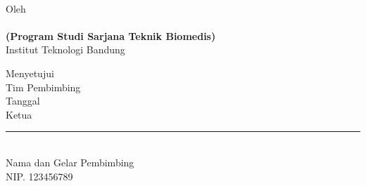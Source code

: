\clearpage
\pagestyle{empty}

\begin{center}
	\renewcommand{\baselinestretch}{1}
    \large{\bfseries \MakeUppercase{\thetitle}}
    \\[2\baselineskip]
	
    \normalsize{Oleh\\
    \textbf{\theauthor}\\
    \textbf{(Program Studi Sarjana Teknik Biomedis)}
    \\[\baselineskip]
    Institut Teknologi Bandung}
    \\[3\baselineskip]

    \normalsize{Menyetujui\\
    Tim Pembimbing
    \\[\baselineskip]
    
    Tanggal \thedate\\[3\baselineskip]
    Ketua\\[4\baselineskip]
    \rule{5cm}{0.4pt} \\
    Nama dan Gelar Pembimbing\\
    NIP. 123456789}

\end{center}
\clearpage
